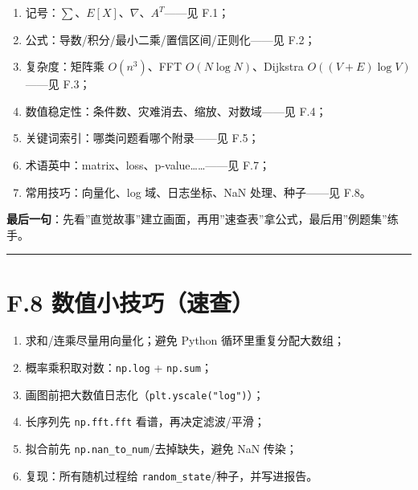 \begin{enumerate}
\def\labelenumi{\arabic{enumi}.}
\tightlist
\item
  记号：\(\sum\)、\(E[X]\)、\(\nabla\)、\(A^T\)------见 F.1；
\item
  公式：导数/积分/最小二乘/置信区间/正则化------见 F.2；
\item
  复杂度：矩阵乘 \(O(n^3)\)、FFT \(O(N\log N)\)、Dijkstra
  \(O((V+E)\log V)\)------见 F.3；
\item
  数值稳定性：条件数、灾难消去、缩放、对数域------见 F.4；
\item
  关键词索引：哪类问题看哪个附录------见 F.5；
\item
  术语英中：matrix、loss、p-value\ldots\ldots------见 F.7；
\item
  常用技巧：向量化、log 域、日志坐标、NaN 处理、种子------见 F.8。
\end{enumerate}

\textbf{最后一句}：先看''直觉故事''建立画面，再用''速查表''拿公式，最后用''例题集''练手。

\begin{center}\rule{0.5\linewidth}{0.5pt}\end{center}

\section{F.8
数值小技巧（速查）}\label{f.8-ux6570ux503cux5c0fux6280ux5de7ux901fux67e5}

\begin{enumerate}
\def\labelenumi{\arabic{enumi}.}
\tightlist
\item
  求和/连乘尽量用向量化；避免 Python 循环里重复分配大数组；
\item
  概率乘积取对数：\texttt{np.log} + \texttt{np.sum}；
\item
  画图前把大数值日志化（\texttt{plt.yscale("log")}）；
\item
  长序列先 \texttt{np.fft.fft} 看谱，再决定滤波/平滑；
\item
  拟合前先 \texttt{np.nan\_to\_num}/去掉缺失，避免 NaN 传染；
\item
  复现：所有随机过程给 \texttt{random\_state}/种子，并写进报告。
\end{enumerate}
